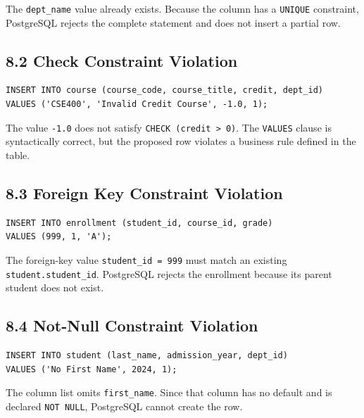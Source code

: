 \documentclass[12pt,a4paper]{article}
\begin{document}
\noindent The \texttt{dept\_name} value already exists. Because the column has a
\texttt{UNIQUE} constraint, PostgreSQL rejects the complete statement and does not insert a partial
row.

\subsection*{8.2 Check Constraint Violation}
\begin{verbatim}
INSERT INTO course (course_code, course_title, credit, dept_id)
VALUES ('CSE400', 'Invalid Credit Course', -1.0, 1);
\end{verbatim}

\noindent The value \texttt{-1.0} does not satisfy \texttt{CHECK (credit > 0)}. The
\texttt{VALUES} clause is syntactically correct, but the proposed row violates a business rule
defined in the table.

\subsection*{8.3 Foreign Key Constraint Violation}
\begin{verbatim}
INSERT INTO enrollment (student_id, course_id, grade)
VALUES (999, 1, 'A');
\end{verbatim}

\noindent The foreign-key value \texttt{student\_id = 999} must match an existing
\texttt{student.student\_id}. PostgreSQL rejects the enrollment because its parent student does not
exist.

\subsection*{8.4 Not-Null Constraint Violation}
\begin{verbatim}
INSERT INTO student (last_name, admission_year, dept_id)
VALUES ('No First Name', 2024, 1);
\end{verbatim}

\noindent The column list omits \texttt{first\_name}. Since that column has no default and is
declared \texttt{NOT NULL}, PostgreSQL cannot create the row.

\end{document}
